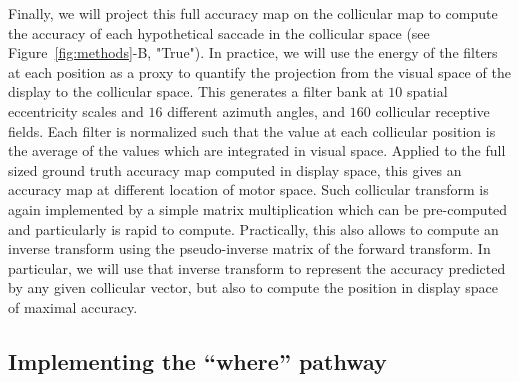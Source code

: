 Finally, we will project this full accuracy map on the collicular map to compute the accuracy of each hypothetical saccade in the collicular space (see  Figure~\ref{fig:methods}-B, "True"). In practice, we will use the energy of the filters at each position as a proxy to quantify the projection from the visual space of the display to the collicular space. This generates a filter bank at $10$ spatial eccentricity scales and $16$ different azimuth angles, and $160$ collicular receptive fields. Each filter is normalized such that the value at each collicular position is the average of the values which are integrated in visual space. Applied to the full sized ground truth accuracy map computed in display space, this gives an accuracy map at different location of motor space. Such collicular transform is again implemented by a simple matrix multiplication which can be pre-computed and particularly is rapid to compute. Practically, this also allows to compute an inverse transform using the pseudo-inverse matrix of the forward transform. In particular, we will use that inverse transform to represent the accuracy predicted by any given collicular vector, but also to compute the position in display space of maximal accuracy.

\subsection{Implementing the ``where'' pathway}
